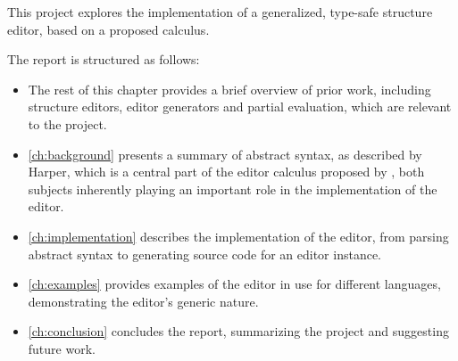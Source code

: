This project explores the implementation of a generalized, type-safe structure editor, based on a proposed calculus\cite{aalborg}.

The report is structured as follows:

\begin{itemize}
    \item The rest of this chapter provides a brief overview of prior work, including structure editors, editor generators and partial evaluation, which are relevant to the project.
    \item \cref{ch:background} presents a summary of abstract syntax, as described by Harper\cite{harper}, which is a central part of the editor calculus proposed by \cite{aalborg}, both
    subjects inherently playing an important role in the implementation of the editor.
    \item \cref{ch:implementation} describes the implementation of the editor, from parsing abstract syntax to generating source code for an editor instance.
    \item \cref{ch:examples} provides examples of the editor in use for different languages, demonstrating the editor's generic nature.
    \item \cref{ch:conclusion} concludes the report, summarizing the project and suggesting future work.
\end{itemize}